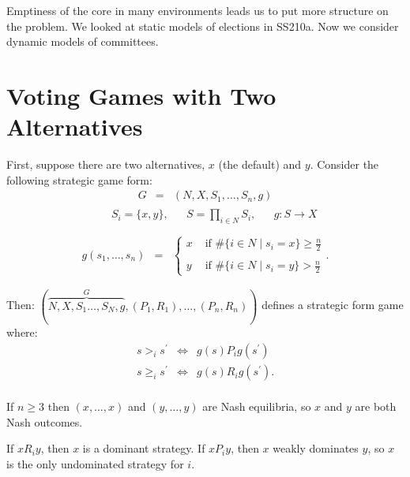 \documentclass[12pt]{article}
\newcommand{\n}{\noindent}
\newcommand{\s}{\vspace{5mm}}
\begin{document}
\s

\n Emptiness of the core in many environments leads us to put more structure on the problem.  We looked at static models of elections in SS210a.  Now we consider dynamic models of committees.

\section{Voting Games with Two Alternatives}

\n First, suppose there are two alternatives, $x$ (the default) and $y$. Consider the following strategic game form:
\begin{eqnarray*}
G&=&(N,X,S_1,\hdots,S_n,g)
\end{eqnarray*}
\begin{eqnarray*}
&&\begin{array}{ccccc}
S_i=\{x,y\},&&S=\prod_{i\in N}S_i,&&g:S\longrightarrow X\\
\end{array}
\end{eqnarray*}
\begin{eqnarray*}
g(s_1,\hdots,s_n)&=&\left\{\begin{array}{cc}
x&\mbox{ if }\#\{i\in N\mid s_i=x\}\geq\frac{n}{2}\\
&\\
y&\mbox{ if }\#\{i\in N\mid s_i=y\}>\frac{n}{2}
\end{array}\right..
\end{eqnarray*} 
\s

\n Then: $(\overbrace{N,X,S_1\hdots,S_N,g}^G,(P_1,R_1),\hdots,(P_n,R_n))$ defines a strategic form game where:
\begin{eqnarray*}
s>_is^{\prime}&\Longleftrightarrow&g(s)P_ig(s^{\prime})\\
s\geq_is^{\prime}&\Longleftrightarrow&g(s)R_ig(s^{\prime}).\\
\end{eqnarray*}

\n If $n\geq 3$ then $(x,\hdots,x)$ and $(y,\hdots,y)$ are Nash equilibria, so $x$ and $y$ are both Nash outcomes.

\s

\n If $xR_iy$, then $x$ is a dominant strategy.  If $xP_iy$, then $x$ weakly dominates $y$, so $x$ is the only undominated strategy for $i$.  
\end{document}
